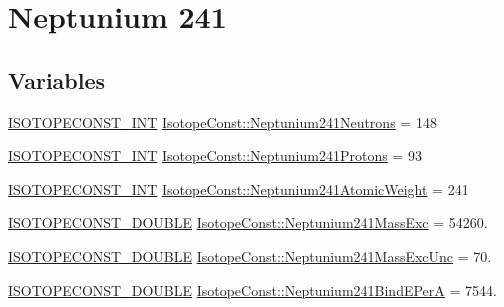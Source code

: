 \hypertarget{group___isotope_const-_neptunium-_np241}{}\section{Neptunium 241}
\label{group___isotope_const-_neptunium-_np241}
\subsection*{Variables}
\begin{DoxyCompactItemize}
\item 
\mbox{\hyperlink{group___isotope_const-_macros_ga5f18360b3e99483a35c32d789e62621c}{I\+S\+O\+T\+O\+P\+E\+C\+O\+N\+S\+T\+\_\+\+I\+NT}} \mbox{\hyperlink{group___isotope_const-_neptunium-_np241_ga168c14174ecba925d1b701963e442a9f}{Isotope\+Const\+::\+Neptunium241\+Neutrons}} = 148
\item 
\mbox{\hyperlink{group___isotope_const-_macros_ga5f18360b3e99483a35c32d789e62621c}{I\+S\+O\+T\+O\+P\+E\+C\+O\+N\+S\+T\+\_\+\+I\+NT}} \mbox{\hyperlink{group___isotope_const-_neptunium-_np241_gaeae4bceb8934d25ac1929eb0375b0f65}{Isotope\+Const\+::\+Neptunium241\+Protons}} = 93
\item 
\mbox{\hyperlink{group___isotope_const-_macros_ga5f18360b3e99483a35c32d789e62621c}{I\+S\+O\+T\+O\+P\+E\+C\+O\+N\+S\+T\+\_\+\+I\+NT}} \mbox{\hyperlink{group___isotope_const-_neptunium-_np241_ga1d5a46d0ff122f048f05fd56f83fa8c2}{Isotope\+Const\+::\+Neptunium241\+Atomic\+Weight}} = 241
\item 
\mbox{\hyperlink{group___isotope_const-_macros_ga8f45a7272ce02c0b4c65c44636ed719a}{I\+S\+O\+T\+O\+P\+E\+C\+O\+N\+S\+T\+\_\+\+D\+O\+U\+B\+LE}} \mbox{\hyperlink{group___isotope_const-_neptunium-_np241_ga21e8248c64bc2849557d097191fbc126}{Isotope\+Const\+::\+Neptunium241\+Mass\+Exc}} = 54260.
\item 
\mbox{\hyperlink{group___isotope_const-_macros_ga8f45a7272ce02c0b4c65c44636ed719a}{I\+S\+O\+T\+O\+P\+E\+C\+O\+N\+S\+T\+\_\+\+D\+O\+U\+B\+LE}} \mbox{\hyperlink{group___isotope_const-_neptunium-_np241_gaccfff9d6fbd754a9b61de040ff9cceb4}{Isotope\+Const\+::\+Neptunium241\+Mass\+Exc\+Unc}} = 70.
\item 
\mbox{\hyperlink{group___isotope_const-_macros_ga8f45a7272ce02c0b4c65c44636ed719a}{I\+S\+O\+T\+O\+P\+E\+C\+O\+N\+S\+T\+\_\+\+D\+O\+U\+B\+LE}} \mbox{\hyperlink{group___isotope_const-_neptunium-_np241_ga7b01243329c0486933d14d9d062280a7}{Isotope\+Const\+::\+Neptunium241\+Bind\+E\+PerA}} = 7544.
\item 

\end{DoxyCompactItemize}

